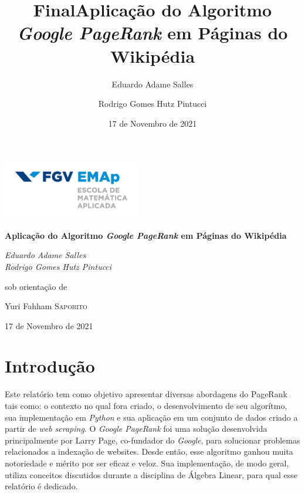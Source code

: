 \documentclass[11pt]{article}
\title{Final}
\title{Aplicação do Algoritmo \emph{Google PageRank}
em Páginas do
Wikipédia}
\author{Eduardo Adame Salles \and Rodrigo Gomes Hutz Pintucci}
\date{17 de Novembro de 2021}
\begin{document}
    
    
    \begin{titlepage}
	\centering
	\includegraphics[width=0.45\textwidth]{emap_logo.png}\par\vspace{1cm}
	\vspace{1.5cm}
	{\huge\bfseries Aplicação do Algoritmo \emph{Google PageRank}
        em Páginas do
        Wikipédia\par}
	\vspace{2cm}
	{\Large\itshape Eduardo Adame Salles \\ Rodrigo Gomes Hutz Pintucci \par}
	\vfill
	sob orientação de\par
	Yuri Fahham \textsc{Saporito}

	\vfill

	{\large 17 de Novembro de 2021 \par}
    \end{titlepage}
    
    \tableofcontents
    
    \setcounter{page}{1}
   
    \newpage
    \setcounter{page}{1}
\hypertarget{introduuxe7uxe3o}{%
\section{Introdução}\label{introduuxe7uxe3o}}

Este relatório tem como objetivo apresentar diversas abordagens do
PageRank tais como: o contexto no qual fora criado, o desenvolvimento de
seu algorítmo, sua implementação em \emph{Python} e sua aplicação em um
conjunto de dados criado a partir de \emph{web scraping}. O
\emph{Google PageRank} foi uma solução desenvolvida principalmente por
Larry Page, co-fundador do \emph{Google}, para solucionar problemas
relacionados a indexação de websites. Desde então, esse algoritmo ganhou
muita notoriedade e mérito por ser eficaz e veloz. Sua implementação, de
modo geral, utiliza conceitos discutidos durante a disciplina de Álgebra
Linear, para qual esse relatório é dedicado.
\end{document}
